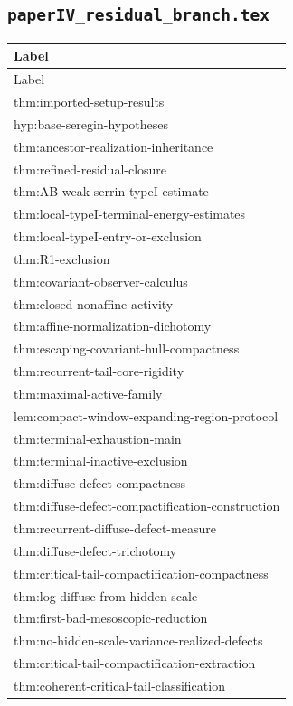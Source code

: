 \documentclass[11pt]{amsart}
\begin{document}
\subsection{\texorpdfstring{\texttt{paperIV\_residual\_branch.tex}}{paperIV residual branch.tex}}

\begin{longtable}{@{}>{\ttfamily\footnotesize\raggedright\arraybackslash}p{}@{}}
\toprule
Label\\
\midrule
\endfirsthead
\toprule
Label\\
\midrule
\endhead
thm:imported-setup-results\\
hyp:base-seregin-hypotheses\\
thm:ancestor-realization-inheritance\\
thm:refined-residual-closure\\
thm:AB-weak-serrin-typeI-estimate\\
thm:local-typeI-terminal-energy-estimates\\
thm:local-typeI-entry-or-exclusion\\
thm:R1-exclusion\\
thm:covariant-observer-calculus\\
thm:closed-nonaffine-activity\\
thm:affine-normalization-dichotomy\\
thm:escaping-covariant-hull-compactness\\
thm:recurrent-tail-core-rigidity\\
thm:maximal-active-family\\
lem:compact-window-expanding-region-protocol\\
thm:terminal-exhaustion-main\\
thm:terminal-inactive-exclusion\\
thm:diffuse-defect-compactness\\
thm:diffuse-defect-compactification-construction\\
thm:recurrent-diffuse-defect-measure\\
thm:diffuse-defect-trichotomy\\
thm:critical-tail-compactification-compactness\\
thm:log-diffuse-from-hidden-scale\\
thm:first-bad-mesoscopic-reduction\\
thm:no-hidden-scale-variance-realized-defects\\
thm:critical-tail-compactification-extraction\\
thm:coherent-critical-tail-classification\\

\end{longtable}
\end{document}
